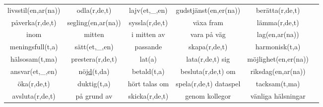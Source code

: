 \begin{center}
\begin{adjustwidth}{-2.2cm}{}
\begin{tabular}{|c c c c c c|}
            livsstil(en,ar(na)) & odla(r,de,t) & lajv(et,\_,en) & gudstjänst(en,er(na)) & berätta(r,de,t) & \\
            påverka(r,de,t) & segling(en,ar(na)) & syssla(r,de,t) & växa fram & lämma(r,de,t) & \\
            inom & mitten & i mitten av & vara på väg & lag(en,ar(na)) & \\
            meningsfull(t,a) & sätt(et,\_,en) & passande & skapa(r,de,t) & harmonisk(t,a) & \\
            hälsosam(t,ma) & prestera(r,de,t) & lat(a) & lata(r,de,t) sig & möjlighet(en,er(na)) & \\
            ansvar(et,\_,en) & nöj\underline{d}(t,da) & betald(t,a) & besluta(r,de,t) om & riksdag(en,ar(na)) & \\
            öka(r,de,t) & duktig(t,a) & hört talas om & spela(r,de,t) dataspel & tacksam(t,ma) & \\
            avsluta(r,de,t) & på grund av & skicka(r,de,t) & genom kollegor & vänliga hälsningar & \\
            \hline
        \end{tabular}
    \end{adjustwidth}
\end{center}

